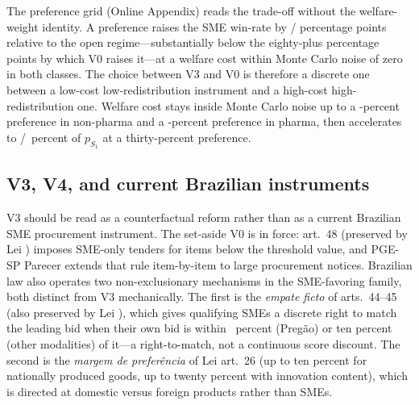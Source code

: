 The preference grid (Online Appendix) reads the trade-off without the welfare-weight identity. A \optPrefThreshold{} preference raises the SME win-rate by \prefSmeWinGainTenNp/\prefSmeWinGainTenPh{} percentage points relative to the open regime---substantially below the eighty-plus percentage points by which V0 raises it---at a welfare cost within Monte Carlo noise of zero in both classes. The choice between V3 and V0 is therefore a discrete one between a low-cost low-redistribution instrument and a high-cost high-redistribution one. Welfare cost stays inside Monte Carlo noise up to a \prefSafeBandHiNp{}-percent preference in non-pharma and a \prefSafeBandHiPh{}-percent preference in pharma, then accelerates to \welfPrefThirtyNp/\welfPrefThirtyPh~percent of $p_{S_1}$ at a thirty-percent preference.

\subsection{V3, V4, and current Brazilian instruments}

V3 should be read as a counterfactual reform rather than as a current Brazilian SME procurement instrument. The set-aside V0 is in force: \LCSmeStatute{} art.~48 (preserved by Lei \leiNova{}) imposes SME-only tenders for items below the threshold value, and PGE-SP Parecer \pareceNum{} extends that rule item-by-item to large procurement notices. Brazilian law also operates two non-exclusionary mechanisms in the SME-favoring family, both distinct from V3 mechanically. The first is the \emph{empate ficto} of \LCSmeStatute{} arts.~44--45 (also preserved by Lei \leiNova{}), which gives qualifying SMEs a discrete right to match the leading bid when their own bid is within \empateBand~percent (Preg\~ao) or ten percent (other modalities) of it---a right-to-match, not a continuous score discount. The second is the \emph{margem de prefer\^encia} of Lei \leiNova{} art.~26 (up to ten percent for nationally produced goods, up to twenty percent with innovation content), which is directed at domestic versus foreign products rather than SMEs.

